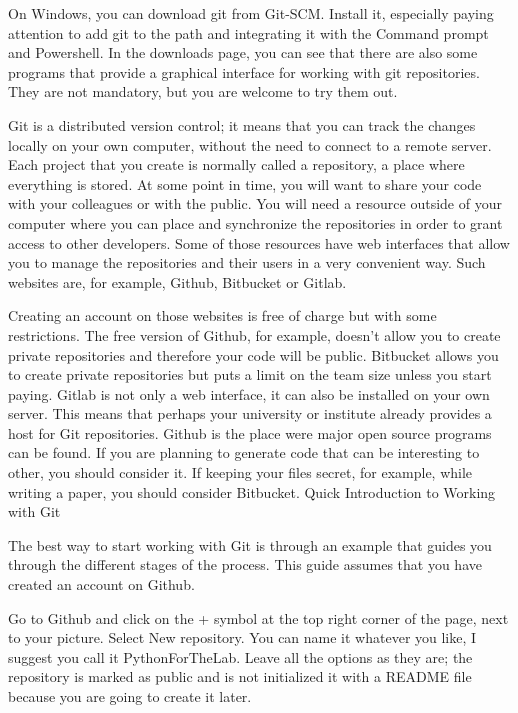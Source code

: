 On Windows, you can download git from Git-SCM. Install it, especially paying attention to add git to the path and integrating it with the Command prompt and Powershell. In the downloads page, you can see that there are also some programs that provide a graphical interface for working with git repositories. They are not mandatory, but you are welcome to try them out.

Git is a distributed version control; it means that you can track the changes locally on your own computer, without the need to connect to a remote server. Each project that you create is normally called a repository, a place where everything is stored. At some point in time, you will want to share your code with your colleagues or with the public. You will need a resource outside of your computer where you can place and synchronize the repositories in order to grant access to other developers. Some of those resources have web interfaces that allow you to manage the repositories and their users in a very convenient way. Such websites are, for example, Github, Bitbucket or Gitlab.

Creating an account on those websites is free of charge but with some restrictions. The free version of Github, for example, doesn’t allow you to create private repositories and therefore your code will be public. Bitbucket allows you to create private repositories but puts a limit on the team size unless you start paying. Gitlab is not only a web interface, it can also be installed on your own server. This means that perhaps your university or institute already provides a host for Git repositories. Github is the place were major open source programs can be found. If you are planning to generate code that can be interesting to other, you should consider it. If keeping your files secret, for example, while writing a paper, you should consider Bitbucket.
Quick Introduction to Working with Git

The best way to start working with Git is through an example that guides you through the different stages of the process. This guide assumes that you have created an account on Github.

Go to Github and click on the + symbol at the top right corner of the page, next to your picture. Select New repository. You can name it whatever you like, I suggest you call it PythonForTheLab. Leave all the options as they are; the repository is marked as public and is not initialized it with a README file because you are going to create it later.

